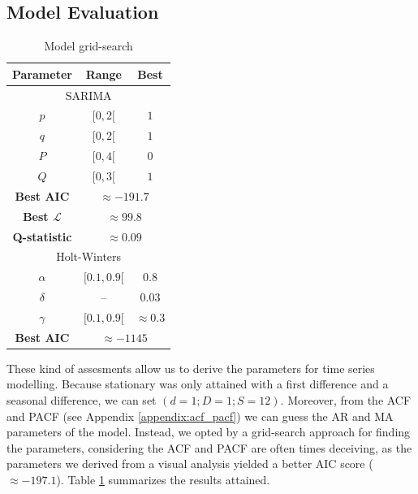 \documentclass[conference]{IEEEtran}
\begin{document}
\subsection{Model Evaluation}

\begin{table}[btp]
    \caption{Model grid-search}
    \centering
    \begin{tabular}{c|c|c}
        Parameter & Range & Best \\
        \hline\hline
        \multicolumn{3}{c}{SARIMA} \\
        \hline
        $p$ & $[0,2[$ & $1$ \\
        $q$ & $[0,2[$ & $1$ \\
        $P$ & $[0,4[$ & $0$ \\
        $Q$ & $[0,3[$ & $1$ \\
        \hline
        \textbf{Best AIC}& \multicolumn{2}{c}{$\approx -191.7$} \\
        \textbf{Best $\mathcal{L}$}& \multicolumn{2}{c}{$\approx 99.8$} \\
        \textbf{Q-statistic}& \multicolumn{2}{c}{$\approx 0.09$} \\
        \hline\hline
        \multicolumn{3}{c}{Holt-Winters} \\
        \hline
        $\alpha$ & $[0.1,0.9[$ & $0.8$ \\
        $\delta$ & -- & $0.03$ \\
        $\gamma$ & $[0.1,0.9[$ & $\approx 0.3$ \\
        \hline\hline
        \textbf{Best AIC}& \multicolumn{2}{c}{$\approx -1145$}
    \end{tabular}
    \label{tab:grid-search}
\end{table}

These kind of assesments allow us to derive the parameters for time series modelling. Because stationary was only attained with a first difference and a seasonal difference, we can set $(d=1;D=1;S=12)$. Moreover, from the ACF and PACF (see Appendix \ref{appendix:acf_pacf}) we can guess the AR and MA parameters of the model. Instead, we opted by a grid-search approach for finding the parameters, considering the ACF and PACF are often times deceiving, as the parameters we derived from a visual analysis yielded a better AIC score ($\approx -197.1$). Table \ref{tab:grid-search} summarizes the results attained.
\end{document}
